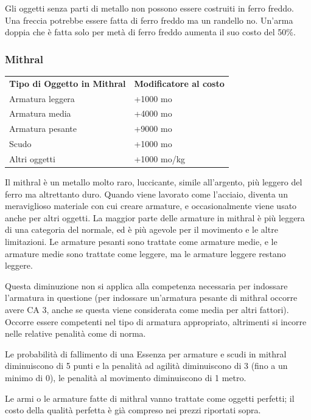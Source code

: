 \documentclass[a4paper,11pt,twoside,openany]{book}
\begin{document}
Gli oggetti senza parti di metallo non possono essere costruiti in ferro freddo. Una freccia potrebbe essere fatta di ferro freddo ma un randello no. Un'arma doppia che è fatta solo per metà di ferro freddo aumenta il suo costo del 50\%.

\subsubsection{Mithral}

\label{mithral}

\begin{tabular}{ll}
	\toprule
	\textbf{Tipo di Oggetto in Mithral} & \textbf{Modificatore al costo}\\
	Armatura leggera                    & +1000 mo\\
	Armatura media                      & +4000 mo\\
	Armatura pesante                    & +9000 mo\\
	Scudo                               & +1000 mo\\
	Altri oggetti                       & +1000 mo/kg\\
\end{tabular}

\bigskip

Il mithral è un metallo molto raro, luccicante, simile all'argento, più leggero del ferro ma altrettanto duro. Quando viene lavorato come l'acciaio, diventa un meraviglioso materiale con cui creare armature, e occasionalmente viene usato anche per altri oggetti. La maggior parte delle armature in mithral è più leggera di una categoria del normale, ed è più agevole per il movimento e le altre limitazioni. Le armature pesanti sono trattate come armature medie, e le armature medie sono trattate come leggere, ma le armature leggere restano leggere.

Questa diminuzione non si applica alla competenza necessaria per indossare l'armatura in questione (per indossare un'armatura pesante di mithral occorre avere CA 3, anche se questa viene considerata come media per altri fattori). Occorre essere competenti nel tipo di armatura appropriato, altrimenti si incorre nelle relative penalità come di norma.

Le probabilità di fallimento di una Essenza per armature e scudi in mithral diminuiscono di 5 punti e la penalità ad agilità diminuiscono di 3 (fino a un minimo di 0), le penalità al movimento diminuiscono di 1 metro.

Le armi o le armature fatte di mithral vanno trattate come oggetti perfetti; il costo della qualità perfetta è già compreso nei prezzi riportati sopra.
\end{document}
